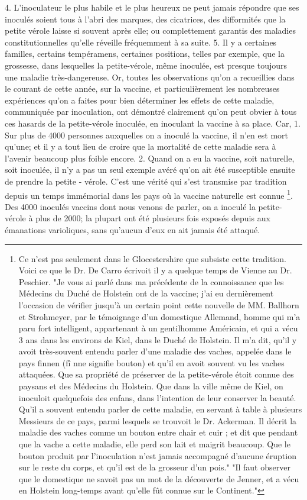 4. L'inoculateur le plus habile et le plus\setcounter{page}{267} heureux ne peut jamais répondre que ses inoculés soient tous à l'abri des marques, des cicatrices, des difformités que la petite vérole laisse si souvent après elle; ou complettement garantis des maladies constitutionnelles qu'elle réveille fréquemment à sa suite.
5. Il y a certaines familles, certains tempéramens, certaines positions, telles par exemple, que la grossesse, dans lesquelles la petite-vérole, même inoculée, est presque toujours une maladie très-dangereuse.
Or, toutes les observations qu'on a recueillies dans le courant de cette année, sur la vaccine, et particulièrement les nombreuses expériences qu'on a faites pour bien déterminer les effets de cette maladie, communiquée par inoculation, ont démontré clairement qu'on peut obvier à tous ces hasards de la petite-vérole inoculée, en inoculant la vaccine à sa place. Car,
1. Sur plus de 4000 personnes auxquelles on a inoculé la vaccine, il n'en est mort qu'une; et il y a tout lieu de croire que la mortalité de cette maladie sera à l'avenir beaucoup plus foible encore.
2. Quand on a eu la vaccine, soit naturelle, soit inoculée, il n'y a pas un seul exemple avéré qu'on ait été susceptible ensuite de prendre la petite - vérole. C'est une vérité qui\setcounter{page}{268} s'est transmise par tradition depuis un temps immémorial dans les pays où la vaccine naturelle est connue \footnote{Ce n'est pas seulement dans le Glocestershire que subsiste cette tradition. Voici ce que le Dr. De Carro écrivoit il y a quelque temps de Vienne au Dr. Peschier. "Je vous ai parlé dans ma précédente de la connoissance que les Médecins du Duché de Holstein ont de la vaccine; j'ai eu dernièrement l'occasion de vérifier jusqu'à un certain point cette nouvelle de MM. Ballhorn et Strohmeyer, par le témoignage d'un domestique Allemand, homme qui m'a paru fort intelligent, appartenant à un gentilhomme Américain, et qui a vécu 3 ans dans les environs de Kiel, dans le Duché de Holstein. Il m'a dit, qu'il y avoit très-souvent entendu parler d'une maladie des vaches, appelée dans le pays finnen (fî nne signifie bouton) et qu'il en avoit souvent vu les vaches attaquées. Que sa propriété de préserver de la petite-vérole étoit connue des paysans et des Médecins du Holstein. Que dans la ville même de Kiel, on inoculoit quelquefois des enfans, dans l'intention de leur conserver la beauté. Qu'il a souvent entendu parler de cette maladie, en servant à table à plusieurs Messieurs de ce pays, parmi lesquels se trouvoit le Dr. Ackerman. Il décrit la maladie des vaches comme un bouton entre chair et cuir ; et dit que pendant que la vache a cette maladie, elle perd son lait et maigrit beaucoup. Que le bouton produit par l'inoculation n'est jamais accompagné d'aucune éruption sur le reste du corps, et qu'il est de la grosseur d'un pois."
"Il faut observer que le domestique ne savoit pas un mot de la découverte de Jenner, et a vécu en Holstein long-temps avant qu'elle fût connue sur le Continent."}. Des 4000 inoculés vaccins dont nous venons de parler, on a inoculé la petite-vérole à plus de 2000; la plupart ont été plusieurs fois exposés depuis aux émanations varioliques, sans qu'aucun d'eux en ait jamais été attaqué.

